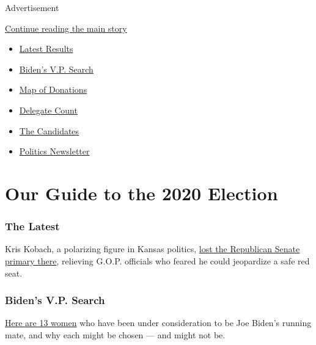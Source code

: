 Advertisement

\protect\hyperlink{after-subheader}{Continue reading the main story}

\begin{itemize}
\item
  \href{https://www.nytimes3xbfgragh.onion/interactive/2020/08/04/us/elections/results-arizona-kansas-michigan-missouri-primaries.html}{Latest
  Results}
\item
  \href{https://www.nytimes3xbfgragh.onion/article/biden-vice-president-2020.html}{Biden's
  V.P. Search}
\item
  \href{https://www.nytimes3xbfgragh.onion/interactive/2020/07/24/us/politics/trump-biden-campaign-donors.html}{Map
  of Donations}
\item
  \href{https://www.nytimes3xbfgragh.onion/interactive/2020/us/elections/delegate-count-primary-results.html}{Delegate
  Count}
\item
  \href{https://www.nytimes3xbfgragh.onion/interactive/2019/us/politics/2020-presidential-candidates.html}{The
  Candidates}
\item
  \href{https://www.nytimes3xbfgragh.onion/newsletters/politics}{Politics
  Newsletter}
\end{itemize}

\hypertarget{our-guide-to-the-2020-election}{%
\section{Our Guide to the 2020
Election}\label{our-guide-to-the-2020-election}}

\hypertarget{the-latest}{%
\subsubsection{The Latest}\label{the-latest}}

Kris Kobach, a polarizing figure in Kansas politics,
\href{https://www.nytimes3xbfgragh.onion/2020/08/04/us/politics/kobach-tlaib.html}{lost
the Republican Senate primary there}, relieving G.O.P. officials who
feared he could jeopardize a safe red seat.

\hypertarget{bidens-vp-search}{%
\subsubsection{Biden's V.P. Search}\label{bidens-vp-search}}

\href{https://www.nytimes3xbfgragh.onion/article/biden-vice-president-2020.html}{Here
are 13 women} who have been under consideration to be Joe Biden's
running mate, and why each might be chosen --- and might not be.

